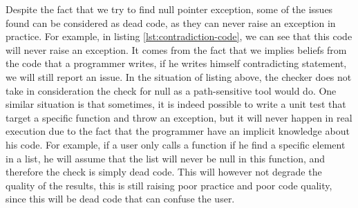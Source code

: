 

Despite the fact that we try to find null pointer exception, some of the issues found can be considered as dead code, as they can never raise an exception in practice. 
For example, in listing \ref{lst:contradiction-code}, we can see that this code will never raise an exception. 
It comes from the fact that we implies beliefs from the code that a programmer writes, if he writes himself contradicting statement, we will still report an issue. 
In the situation of listing above, the checker does not take in consideration the check for null as a path-sensitive tool would do. \newline
One similar situation is that sometimes, it is indeed possible to write a unit test that target a specific function and throw an exception, but it will never happen in real execution due to the fact that the programmer have an implicit knowledge about his code. 
For example, if a user only calls a function if he find a specific element in a list, he will assume that the list will never be null in this function, and therefore the check is simply dead code. 
This will however not degrade the quality of the results, this is still raising poor practice and poor code quality, since this will be dead code that can confuse the user.










